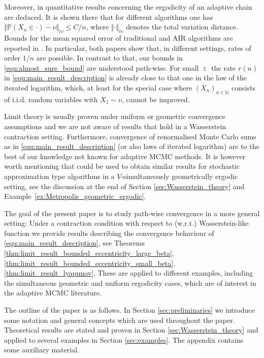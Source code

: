 \documentclass[12pt]{article}
\theoremstyle{definition}
\newcommand{\norm}[1]{\left\Vert #1 \right\Vert}
\newcommand{\N}{\mathbb{N}}
\DeclareMathOperator{\eps}{\varepsilon}
\begin{document}
Moreover, in \cite{andrieu2007efficiency,atchade2015convergence} quantitative results concerning the ergodicity of an adaptive chain are deduced.  
It is shown there that for different algorithms one has $\norm{\mathbb{P}(X_n \in \cdot) - \nu}_{tv} \leq C/n$, where $\norm{\cdot}_{tv}$ denotes the 
total variation distance.
Bounds for the mean squared error of traditional and AIR algorithms are 
reported in
\cite{atchade2015convergence, chimisov2018air}.
In particular, both papers show that, in different settings, rates of order $1/n$ are possible.  
In contrast to that, our bounds in \eqref{equ:almost_sure_bound} are understood path-wise. 
For small $\eps$ the rate $r(n)$ in \eqref{equ:main_result_description} is already close to that one in the law of the iterated logarithm, which, at least for the special case where $(X_n)_{n \in \N}$ consists of i.i.d. 
random variables
with $X_1 \sim \nu$, cannot be improved. 

Limit theory is usually proven under uniform or geometric convergence assumptions and we are not aware of results that hold in a Wasserstein contraction setting.
Furthermore, convergence of renormalised Monte Carlo sums as in \eqref{equ:main_result_description} (or also laws of iterated logarithm) are to the best of our knowledge not known for adaptive MCMC methods.  
It is however worth mentioning that \cite[Proposition 6]{saksman2010ergodicity} could be used to obtain similar results for stochastic approximation type algorithms in a $V$-simultaneously geometrically ergodic setting, see the discussion at the end of Section \ref{sec:Wasserstein_theory} and Example~\ref{ex:Metropolis_geometric_ergodic}.

The goal of the present paper is to study path-wise convergence in a more general setting:
Under a contraction condition 
with respect to (w.r.t.)
Wasserstein-like function we provide results describing the convergence behaviour of \eqref{equ:main_result_description}, see Theorems \ref{thm:limit_result_bounded_eccentricity_large_beta}, \ref{thm:limit_result_bounded_eccentricity_small_beta}, \ref{thm:limit_result_lyapunov}.  
These are applied to different examples, {including the simultaneous geometric and uniform ergodicity cases}, which are of interest in {the} adaptive  MCMC literature. 

The outline of the paper is as follows. In Section \ref{sec:preliminaries} we introduce some notation and general concepts which are used throughout the paper. 
Theoretical results are stated and proven in Section \ref{sec:Wasserstein_theory} and applied to several examples in Section \ref{sec:examples}. 
The appendix contains some auxiliary material. 
\end{document}
